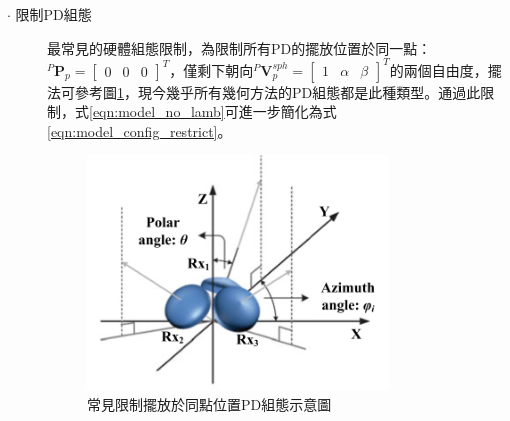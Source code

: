 \begin{description}
            \item[$\cdot$ 限制PD組態]\hfill
            
            \qquad
            最常見的硬體組態限制，為限制所有PD的擺放位置於同一點：$^P\boldsymbol{P}_p=
            \left[\begin{array}{ccc}0&0&0\end{array}\right]^T$，僅剩下朝向$^P\boldsymbol{V}_p^{sph} = \left[\begin{array}{ccc}1&\alpha&\beta\end{array}\right]^T$的兩個自由度，擺法可參考圖\ref{pic:config_orient}，現今幾乎所有幾何方法的PD組態都是此種類型\cite{survey_light2018}。通過此限制，式\ref{eqn:model_no_lamb}可進一步簡化為式\ref{eqn:model_config_restrict}。
            
            \begin{figure}[ht]
                \centering
                \includegraphics[width=8cm]{ch2pic/config_orient.png}
                \caption{常見限制擺放於同點位置PD組態示意圖\cite{case:3d_layers}}
                \label{pic:config_orient}
            \end{figure}


\end{description}
